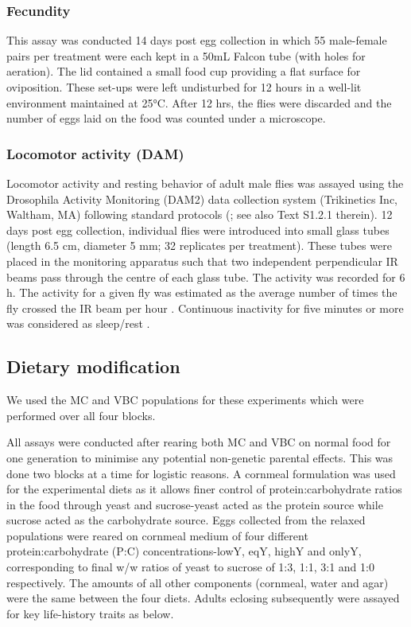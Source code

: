 \documentclass[12pt,onecolumn,twoside]{article}
\begin{document}
	\subsubsection{Fecundity}
	This assay was conducted 14 days post egg collection in which 55 male-female pairs per treatment were each kept in a 50mL Falcon tube (with holes for aeration). The lid contained a small food cup providing a flat surface for oviposition. These set-ups were left undisturbed for 12 hours in a well-lit environment maintained at 25°C. After 12 hrs, the flies were discarded and the number of eggs laid on the food was counted under a microscope.
	\subsubsection{{Locomotor activity (DAM)}}
	Locomotor activity and resting behavior of adult male flies was assayed using the Drosophila Activity Monitoring (DAM2) data collection system (Trikinetics Inc, Waltham, MA) following standard protocols (\cite{Chiu2010}; see also Text S1.2.1 therein). 12 days post egg collection, individual flies were introduced into small glass tubes (length 6.5 cm, diameter 5 mm; 32 replicates per treatment). These tubes were placed in the monitoring apparatus such that two independent perpendicular IR beams pass through the centre of each glass tube. The activity was recorded for 6 h. The activity for a given fly was estimated as the average number of times the fly crossed the IR beam per hour \citep{Chadov2015}. Continuous inactivity for five minutes or more was considered as sleep/rest \citep{Hendricks2000, Chiu2010}.

	\subsection{Dietary modification}
	We used the MC and VBC populations for these experiments which were performed over all four blocks.

	All assays were conducted after rearing both MC and VBC on normal food for one generation to minimise any potential non-genetic parental effects. This was done two blocks at a time for logistic reasons. A cornmeal formulation was used for the experimental diets as it allows finer control of protein:carbohydrate ratios in the food through yeast and sucrose-yeast acted as the protein source while sucrose acted as the carbohydrate source. Eggs collected from the relaxed populations were reared on cornmeal medium of four different protein:carbohydrate (P:C) concentrations-lowY, eqY, highY and onlyY, corresponding to final w/w ratios of yeast to sucrose of 1:3, 1:1, 3:1 and 1:0 respectively. The amounts of all other components (cornmeal, water and agar) were the same between the four diets. Adults eclosing subsequently were assayed for key life-history traits as below.
\end{document}
